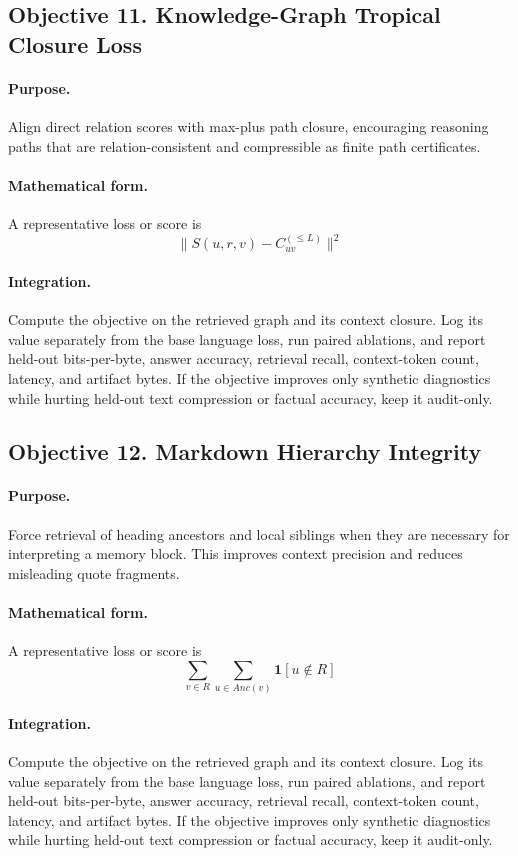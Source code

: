 \documentclass[11pt]{article}
\theoremstyle{definition}
\theoremstyle{remark}
\begin{document}
\subsection{Objective 11. Knowledge-Graph Tropical Closure Loss}
\paragraph{Purpose.} Align direct relation scores with max-plus path closure, encouraging reasoning paths that are relation-consistent and compressible as finite path certificates.

\paragraph{Mathematical form.} A representative loss or score is
\[
    \|S(u,r,v)-C^{(\le L)}_{uv}\|^2
\]

\paragraph{Integration.} Compute the objective on the retrieved graph and its context closure. Log its value separately from the base language loss, run paired ablations, and report held-out bits-per-byte, answer accuracy, retrieval recall, context-token count, latency, and artifact bytes. If the objective improves only synthetic diagnostics while hurting held-out text compression or factual accuracy, keep it audit-only.


\subsection{Objective 12. Markdown Hierarchy Integrity}
\paragraph{Purpose.} Force retrieval of heading ancestors and local siblings when they are necessary for interpreting a memory block. This improves context precision and reduces misleading quote fragments.

\paragraph{Mathematical form.} A representative loss or score is
\[
    \sum_{v\in R}\sum_{u\in Anc(v)}\mathbf 1[u\notin R]
\]

\paragraph{Integration.} Compute the objective on the retrieved graph and its context closure. Log its value separately from the base language loss, run paired ablations, and report held-out bits-per-byte, answer accuracy, retrieval recall, context-token count, latency, and artifact bytes. If the objective improves only synthetic diagnostics while hurting held-out text compression or factual accuracy, keep it audit-only.
\end{document}
